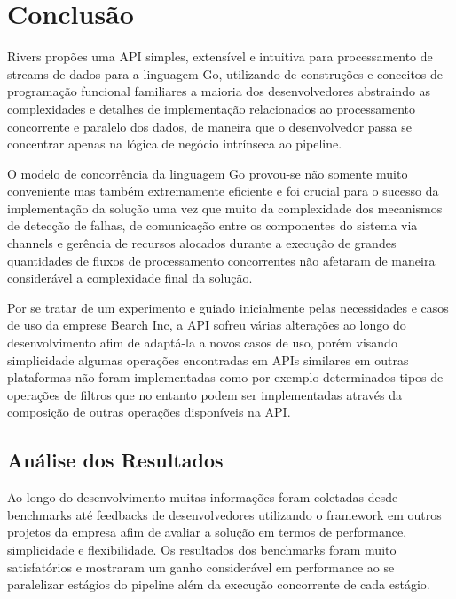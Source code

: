 \chapter{Conclusão}
\label{cha:conclusion}

Rivers propões uma API simples, extensível e intuitiva para processamento de streams de dados para a linguagem Go, utilizando de construções e conceitos de programação funcional familiares a maioria dos desenvolvedores abstraindo as complexidades e detalhes de implementação relacionados ao processamento concorrente e paralelo dos dados, de maneira que o desenvolvedor passa se concentrar apenas na lógica de negócio intrínseca ao pipeline.

O modelo de concorrência da linguagem Go provou-se não somente muito conveniente mas também extremamente eficiente e foi crucial para o sucesso da implementação da solução uma vez que muito da complexidade dos mecanismos de detecção de falhas, de comunicação entre os componentes do sistema via channels e gerência de recursos alocados durante a execução de grandes quantidades de fluxos de processamento concorrentes não afetaram de maneira considerável a complexidade final da solução.

Por se tratar de um experimento e guiado inicialmente pelas necessidades e casos de uso da emprese Bearch Inc, a API sofreu várias alterações ao longo do desenvolvimento afim de adaptá-la a novos casos de uso, porém visando simplicidade algumas operações encontradas em APIs similares em outras plataformas não foram implementadas como por exemplo determinados tipos de operações de filtros que no entanto podem ser implementadas através da composição de outras operações disponíveis na API.

\section{Análise dos Resultados}
\label{sec:results}

Ao longo do desenvolvimento muitas informações foram coletadas desde benchmarks até feedbacks de desenvolvedores utilizando o framework em outros projetos da empresa afim de avaliar a solução em termos de performance, simplicidade e flexibilidade. Os resultados dos benchmarks foram muito satisfatórios e mostraram um ganho considerável em performance ao se paralelizar estágios do pipeline além da execução concorrente de cada estágio.

